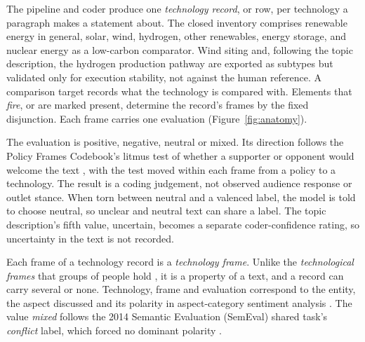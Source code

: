 The pipeline and coder produce one \emph{technology record}, or row, per technology a paragraph makes a statement about. The closed inventory comprises renewable energy in general, solar, wind, hydrogen, other renewables, energy storage, and nuclear energy as a low-carbon comparator. Wind siting and, following the topic description, the hydrogen production pathway \parencite{sadatrazavi2024hydrogen} are exported as subtypes but validated only for execution stability, not against the human reference. A comparison target records what the technology is compared with. Elements that \emph{fire}, or are marked present, determine the record's frames by the fixed disjunction. Each frame carries one evaluation (Figure~\ref{fig:anatomy}).



The evaluation is positive, negative, neutral or mixed. Its direction follows the Policy Frames Codebook's litmus test of whether a supporter or opponent would welcome the text \parencite[p.~35]{boydstun2020policyframes}, with the test moved within each frame from a policy to a technology. The result is a coding judgement, not observed audience response or outlet stance. When torn between neutral and a valenced label, the model is told to choose neutral, so unclear and neutral text can share a label. The topic description's fifth value, uncertain, becomes a separate coder-confidence rating, so uncertainty in the text is not recorded.

Each frame of a technology record is a \emph{technology frame}. Unlike the \emph{technological frames} that groups of people hold \parencite{orlikowski1994frames}, it is a property of a text, and a record can carry several or none. Technology, frame and evaluation correspond to the entity, the aspect discussed and its polarity in aspect-category sentiment analysis \parencite{pontiki2014semeval,pontiki2016semeval}. The value \emph{mixed} follows the 2014 Semantic Evaluation (SemEval) shared task's \emph{conflict} label, which forced no dominant polarity \parencite{pontiki2014semeval}.
